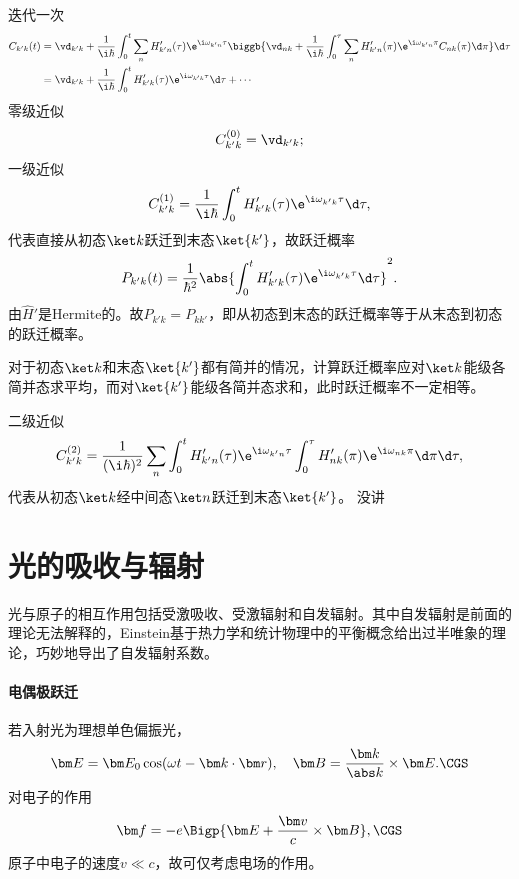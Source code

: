 迭代一次
\begin{align*}
	C_{k'k}(t)&=\vd_{k'k}+\frac1{\i\hbar}\int_0^t\sum_nH'_{k'n}(\tau)\e^{\i\omega_{k'n}\tau}\biggb{\vd_{nk}+\frac1{\i\hbar}\int_0^\tau\sum_nH'_{k'n}(\pi)\e^{\i\omega_{k'n}\pi}C_{nk}(\pi)\d\pi}\d\tau\\
	&=\vd_{k'k}+\frac1{\i\hbar}\int_0^tH'_{k'k}(\tau)\e^{\i\omega_{k'k}\tau}\d\tau+\cdots
\end{align*}
零级近似
\[
C_{k'k}^{(0)}=\vd_{k'k};
\]
一级近似 
\[
C_{k'k}^{(1)}=\frac1{\i\hbar}\int_0^tH'_{k'k}(\tau)\e^{\i\omega_{k'k}\tau}\d\tau,
\]
代表直接从初态$\ket k$跃迁到末态$\ket{k'}$，故跃迁概率
\begin{align}
	P_{k'k}(t)=\frac1{\hbar^2}\abs{\int_0^tH'_{k'k}(\tau)\e^{\i\omega_{k'k}\tau}\d\tau}^2.
\end{align}
由$\hat H'$是Hermite的。故$P_{k'k}=P_{kk'}$，即从初态到末态的跃迁概率等于从末态到初态的跃迁概率。

对于初态$\ket k$和末态$\ket{k'}$都有简并的情况，计算跃迁概率应对$\ket k$能级各简并态求平均，而对$\ket{k'}$能级各简并态求和，此时跃迁概率不一定相等。

二级近似
\[
C_{k'k}^{(2)}=\frac1{(\i\hbar)^2}\sum_n\int_0^tH'_{k'n}(\tau)\e^{\i\omega_{k'n}\tau}\int_0^\tau H'_{nk}(\pi)\e^{\i\omega_{nk}\pi}\d\pi\d\tau,
\]
代表从初态$\ket k$经中间态$\ket n$跃迁到末态$\ket{k'}$。
没讲
\section{光的吸收与辐射}
光与原子的相互作用包括受激吸收、受激辐射和自发辐射。其中自发辐射是前面的理论无法解释的，Einstein基于热力学和统计物理中的平衡概念给出过半唯象的理论，巧妙地导出了自发辐射系数。
\paragraph{电偶极跃迁}若入射光为理想单色偏振光，
\[
	\bm E=\bm E_0\cos(\omega t-\bm k\cdot\bm r),\quad\bm B=\frac{\bm k}{\abs k}\times\bm E.\CGS
\]
对电子的作用 
\[
	\bm f=-e\Bigp{\bm E+\frac{\bm v}c\times\bm B},\CGS
\]
原子中电子的速度$v\ll c$，故可仅考虑电场的作用。

